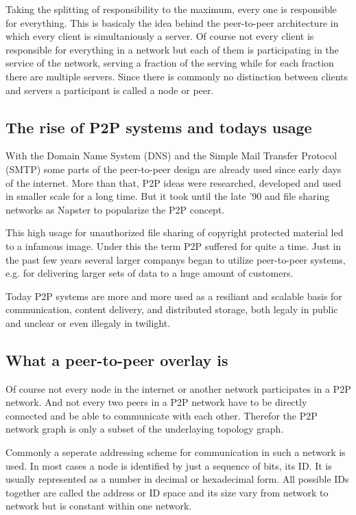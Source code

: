Taking the splitting of responsibility to the maximum, every one is responsible for everything. This is basicaly the idea behind the peer-to-peer architecture in which every client is simultaniously a server. Of course not every client is responsible for everything in a network but each of them is participating in the service of the network, serving a fraction of the serving while for each fraction there are multiple servers. Since there is commonly no distinction between clients and servers a participant is called a node or peer.

\subsection{The rise of P2P systems and todays usage}

With the Domain Name System (DNS) and the Simple Mail Transfer Protocol (SMTP) some parts of the peer-to-peer design are already used since early days of the internet. More than that, P2P ideas were researched, developed and used in smaller scale for a long time. But it took until the late '90 and file sharing networks as Napster to popularize the P2P concept.

This high usage for unauthorized file sharing of copyright protected material led to a infamous image. Under this the term P2P suffered for quite a time. Just in the past few years several larger companys began to utilize peer-to-peer systems, e.g. for delivering larger sets of data to a huge amount of customers.

Today P2P systems are more and more used as a resiliant and scalable basis for communication, content delivery, and distributed storage, both legaly in public and unclear or even illegaly in twilight.

\subsection{What a peer-to-peer overlay is}

Of course not every node in the internet or another network participates in a P2P network. And not every two peers in a P2P network have to be directly connected and be able to communicate with each other. Therefor the P2P network graph is only a subset of the underlaying topology graph.

Commonly a seperate addressing scheme for communication in such a network is used. In most cases a node is identified by just a sequence of bits, its ID. It is usually represented as a number in decimal or hexadecimal form. All possible IDs together are called the address or ID space and its size vary from network to network but is constant within one network.

